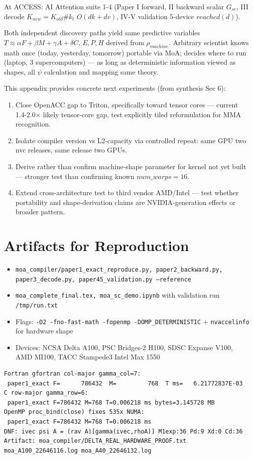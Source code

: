 \documentclass[11pt]{article}
\begin{document}
At ACCESS: AI Attention suite 1-4 (Paper I forward, II backward scalar $G_{sc}$, III decode $K_{new}=K_{old}\#k_t$ $O(dk+dv)$, IV-V validation 5-device $reached(d)$).

Both independent discovery paths yield same predictive variables $T\approx\alpha F+\beta M+\gamma A+\delta C$, $E,P,H$ derived from $\rho_{machine}$. Arbitrary scientist knows math once (today, yesterday, tomorrow) portable via MoA; decides where to run (laptop, 3 supercomputers) — as long as deterministic information viewed as shapes, all $\psi$ calculation and mapping same theory.

This appendix provides concrete next experiments (from synthesis Sec 6):
\begin{enumerate}
\item Close OpenACC gap to Triton, specifically toward tensor cores — current 1.4-2.0$\times$ likely tensor-core gap, test explicitly tiled reformulation for MMA recognition.
\item Isolate compiler version vs L2-capacity via controlled repeat: same GPU two nvc releases, same release two GPUs.
\item Derive rather than confirm machine-shape parameter for kernel not yet built — stronger test than confirming known $num\_warps=16$.
\item Extend cross-architecture test to third vendor AMD/Intel — test whether portability and shape-derivation claims are NVIDIA-generation effects or broader pattern.
\end{enumerate}

\section{Artifacts for Reproduction}
\begin{itemize}
\item \texttt{moa\_compiler/paper1\_exact\_reproduce.py, paper2\_backward.py, paper3\_decode.py, paper45\_validation.py --reference}
\item \texttt{moa\_complete\_final.tex, moa\_sc\_demo.ipynb} with validation run \texttt{/tmp/run.txt}
\item Flags: \texttt{-O2 -fno-fast-math -fopenmp -DOMP\_DETERMINISTIC} + \texttt{nvaccelinfo} for hardware shape
\item Devices: NCSA Delta A100, PSC Bridges-2 H100, SDSC Expanse V100, AMD MI100, TACC Stampede3 Intel Max 1550
\end{itemize}


\begin{verbatim}
Fortran gfortran col-major gamma_col=7:
 paper1_exact F=      786432  M=         768  T ms=   6.21772837E-03
C row-major gamma_row=6:
 paper1_exact F=786432 M=768 T=0.006218 ms bytes=3.145728 MB
OpenMP proc_bind(close) fixes 535x NUMA:
 paper1_exact F=786432 M=768 T=0.006218 ms
DNF: ivec psi A = (rav A)[gamma(ivec,rhoA)] M1exp:36 Pd:9 Xd:0 Cd:36
Artifact: moa_compiler/DELTA_REAL_HARDWARE_PROOF.txt moa_A100_22646116.log moa_A40_22646132.log
\end{verbatim}
\end{document}
